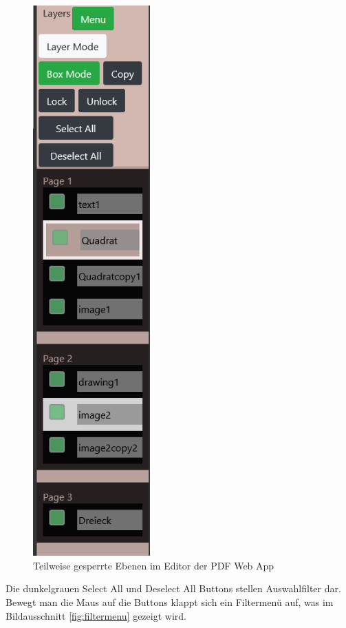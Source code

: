 \begin{figure}[!htbp]
	\centering
	\includegraphics[width=0.4\textwidth]{"images/ebenen2.png"}
	\caption{Teilweise gesperrte Ebenen im Editor der PDF Web App}
	\label{fig:ebenen2}
\end{figure}

Die dunkelgrauen Select All und Deselect All Buttons stellen Auswahlfilter dar. Bewegt man die Maus auf die Buttons klappt sich ein Filtermenü auf, was im Bildausschnitt \ref{fig:filtermenu} gezeigt wird. 

